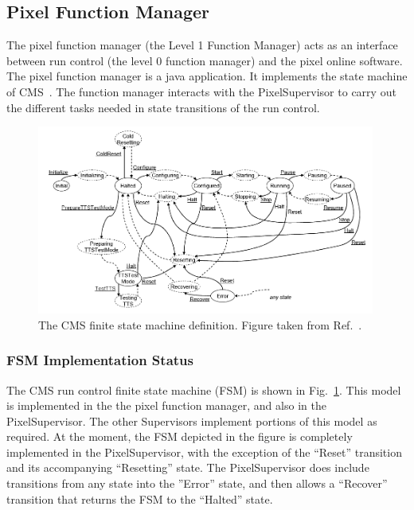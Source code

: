 \subsection{Pixel Function Manager}
\label{sec:l1fm}
The pixel function manager (the Level 1 Function Manager) acts as an interface between
run control (the level 0 function manager) and the pixel
online software. The pixel function manager is a java
application. It implements the state machine of 
CMS~\cite{statemachine}. The function manager interacts
with the PixelSupervisor to carry out the 
different tasks needed in state transitions of the
run control.

\begin{figure}
\begin{center}
\includegraphics[width=0.99\textwidth]{l1fm_states.png}
\end{center}
\caption{The CMS finite state machine definition. Figure taken from Ref.~\cite{statemachine}.}
\label{fig:l1fm}
\end{figure}

\subsubsection{FSM Implementation Status}
The CMS run control finite state machine (FSM) is shown in
Fig.~\ref{fig:l1fm}. This model is implemented in the the pixel
function manager, and also in the PixelSupervisor. The other
Supervisors implement portions of this model as required. At the
moment, the FSM depicted in the figure is completely implemented in
the PixelSupervisor, with the exception of the ``Reset'' transition
and its accompanying ``Resetting'' state. The PixelSupervisor does
include transitions from any state into the ''Error'' state, and then
allows a ``Recover'' transition that returns the FSM to the ``Halted''
state.

